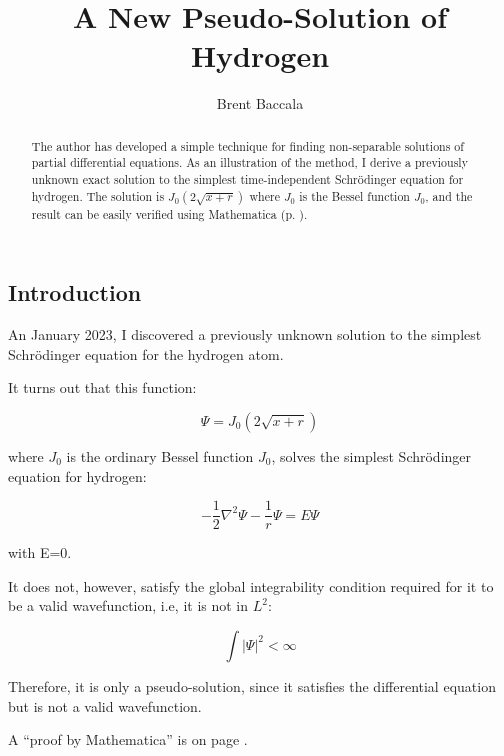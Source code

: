 \documentclass{article}
\title{A New Pseudo-Solution of Hydrogen}
\author{Brent Baccala}
\begin{document}
\parindent 0pt

\maketitle

\begin{abstract}
The author has developed a simple technique
for finding non-separable solutions of partial
differential equations.  As an illustration of the method,
I derive a previously unknown exact solution to the simplest time-independent Schr\"odinger equation for hydrogen.
The solution is $J_0(2\sqrt{x+r})$ where $J_0$ is the Bessel function $J_0$, and
the result can be easily verified using Mathematica (p. \pageref{verification}).
\end{abstract}

\parskip 12pt

\subsection*{Introduction}

An January 2023, I discovered a previously unknown solution to the simplest Schrödinger equation for the hydrogen atom.

It turns out that this function:

\begin{equation}
\label{solution}
\Psi = J_0(2\sqrt{x+r})
\end{equation}

where $J_0$ is the ordinary Bessel function $J_0$, solves the simplest Schrödinger equation for hydrogen:

\begin{equation}
-\frac{1}{2}\nabla^2 \Psi - \frac{1}{r}\Psi = E \Psi
\end{equation}

with E=0.

It does not, however, satisfy the global integrability condition required for it to be a valid wavefunction,
i.e, it is not in $L^2$:

\begin{equation}
\int|\Psi|^2 < \infty
\end{equation}

Therefore, it is only a pseudo-solution, since it satisfies the differential equation but is not a valid wavefunction.

A ``proof by Mathematica'' is on page \pageref{verification}.

\end{document}
